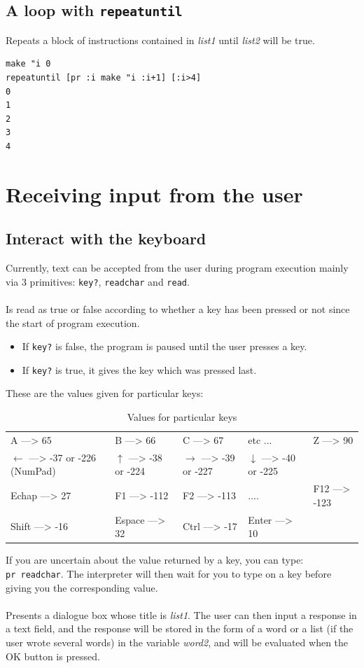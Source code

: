 \subsection{A loop with \texttt{repeatuntil}}
\noindent {}
Repeats a block of instructions contained in \textit{list1} until \textit{list2} will be true.
\begin{verbatim}
make "i 0
repeatuntil [pr :i make "i :i+1] [:i>4]
0
1
2
3
4
\end{verbatim}
\section{Receiving input from the user }
\subsection{Interact with the keyboard}
Currently, text can be accepted from the user during program execution mainly
via 3 primitives: \texttt{key?}, \texttt{readchar} and \texttt{read}.\\ \\
Is read as true or false according to whether a key has been pressed or not since the start of program execution.\\
\begin{itemize}
\item If \texttt{key?} is false, the program is paused until the user presses a key. 
\item If \texttt{key?} is true, it gives the key which was pressed last.
\end{itemize}
These are the values given for particular keys:\\
\begin{table}[h]
\begin{tabular}{|lllll|}
\hline
A ---> 65 & B ---> 66 & C ---> 67 & etc ... & Z ---> 90\\
$\leftarrow$ ---> -37 or -226 (NumPad) & $\uparrow$ ---> -38 or -224  & $\rightarrow$ ---> -39 or -227  & $\downarrow$ ---> -40 or -225 &\\
Echap ---> 27 & F1 ---> -112 & F2 ---> -113 & .... & F12 ---> -123\\
Shift ---> -16 & Espace ---> 32 & Ctrl ---> -17 & Enter ---> 10 &\\
\hline
\end{tabular}
\caption{Values for particular keys}
\end{table}
If you are uncertain about the value returned by a key, you can type:\\
 \texttt{pr readchar}. The interpreter will then wait for you to type
on a key before giving you the corresponding value.\\
\\
Presents a dialogue box whose title is \textit{list1}. The user can then input a response in a text field, and the response will be stored in the form of a word or a list (if the user wrote several words) in the variable \textit{word2}, and will be evaluated when the OK button is pressed.

